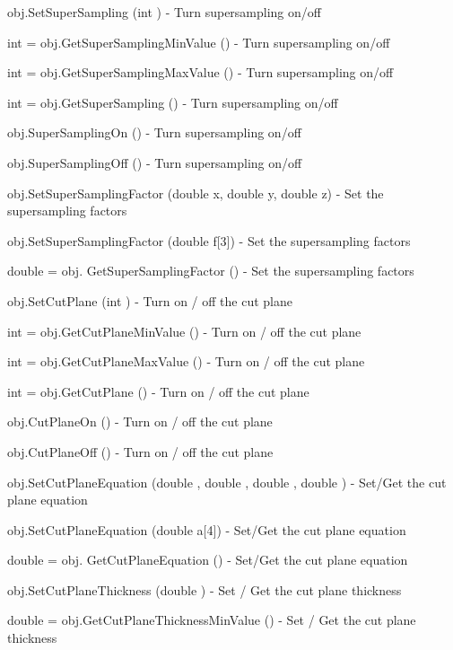 \begin{DoxyItemize}
\item {\ttfamily obj.\-Set\-Super\-Sampling (int )} -\/ Turn supersampling on/off  
\item {\ttfamily int = obj.\-Get\-Super\-Sampling\-Min\-Value ()} -\/ Turn supersampling on/off  
\item {\ttfamily int = obj.\-Get\-Super\-Sampling\-Max\-Value ()} -\/ Turn supersampling on/off  
\item {\ttfamily int = obj.\-Get\-Super\-Sampling ()} -\/ Turn supersampling on/off  
\item {\ttfamily obj.\-Super\-Sampling\-On ()} -\/ Turn supersampling on/off  
\item {\ttfamily obj.\-Super\-Sampling\-Off ()} -\/ Turn supersampling on/off  
\item {\ttfamily obj.\-Set\-Super\-Sampling\-Factor (double x, double y, double z)} -\/ Set the supersampling factors  
\item {\ttfamily obj.\-Set\-Super\-Sampling\-Factor (double f\mbox{[}3\mbox{]})} -\/ Set the supersampling factors  
\item {\ttfamily double = obj. Get\-Super\-Sampling\-Factor ()} -\/ Set the supersampling factors  
\item {\ttfamily obj.\-Set\-Cut\-Plane (int )} -\/ Turn on / off the cut plane  
\item {\ttfamily int = obj.\-Get\-Cut\-Plane\-Min\-Value ()} -\/ Turn on / off the cut plane  
\item {\ttfamily int = obj.\-Get\-Cut\-Plane\-Max\-Value ()} -\/ Turn on / off the cut plane  
\item {\ttfamily int = obj.\-Get\-Cut\-Plane ()} -\/ Turn on / off the cut plane  
\item {\ttfamily obj.\-Cut\-Plane\-On ()} -\/ Turn on / off the cut plane  
\item {\ttfamily obj.\-Cut\-Plane\-Off ()} -\/ Turn on / off the cut plane  
\item {\ttfamily obj.\-Set\-Cut\-Plane\-Equation (double , double , double , double )} -\/ Set/\-Get the cut plane equation  
\item {\ttfamily obj.\-Set\-Cut\-Plane\-Equation (double a\mbox{[}4\mbox{]})} -\/ Set/\-Get the cut plane equation  
\item {\ttfamily double = obj. Get\-Cut\-Plane\-Equation ()} -\/ Set/\-Get the cut plane equation  
\item {\ttfamily obj.\-Set\-Cut\-Plane\-Thickness (double )} -\/ Set / Get the cut plane thickness  
\item {\ttfamily double = obj.\-Get\-Cut\-Plane\-Thickness\-Min\-Value ()} -\/ Set / Get the cut plane thickness  

\end{DoxyItemize}
